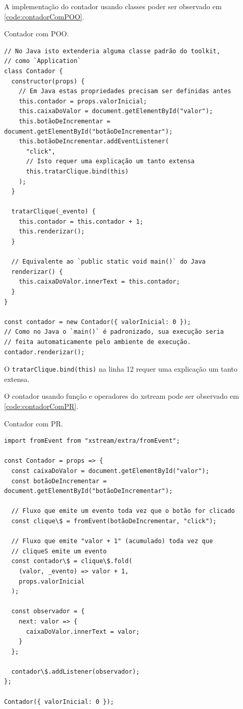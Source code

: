 A implementação do contador usando classes poder ser observado em
\ref{code:contadorComPOO}.

\begin{listing}[htbp]
\caption{\label{code:contadorComPOO}Contador com POO.}
\begin{verbatim}
// No Java isto extenderia alguma classe padrão do toolkit,
// como `Application`
class Contador {
  constructor(props) {
    // Em Java estas propriedades precisam ser definidas antes
    this.contador = props.valorInicial;
    this.caixaDoValor = document.getElementById("valor");
    this.botãoDeIncrementar = document.getElementById("botãoDeIncrementar");
    this.botãoDeIncrementar.addEventListener(
      "click",
      // Isto requer uma explicação um tanto extensa
      this.tratarClique.bind(this)
    );
  }

  tratarClique(_evento) {
    this.contador = this.contador + 1;
    this.renderizar();
  }

  // Equivalente ao `public static void main()` do Java
  renderizar() {
    this.caixaDoValor.innerText = this.contador;
  }
}

const contador = new Contador({ valorInicial: 0 });
// Como no Java o `main()` é padronizado, sua execução seria
// feita automaticamente pelo ambiente de execução.
contador.renderizar();
\end{verbatim}
\end{listing}

O \texttt{tratarClique.bind(this)} na linha 12 requer uma explicação um tanto
extensa.

O contador usando função e operadores do xstream pode ser observado em
\ref{code:contadorComPR}.

\begin{listing}[htbp]
\caption{\label{code:contadorComPR}Contador com PR.}
\begin{verbatim}
import fromEvent from "xstream/extra/fromEvent";

const Contador = props => {
  const caixaDoValor = document.getElementById("valor");
  const botãoDeIncrementar = document.getElementById("botãoDeIncrementar");

  // Fluxo que emite um evento toda vez que o botão for clicado
  const clique\$ = fromEvent(botãoDeIncrementar, "click");

  // Fluxo que emite "valor + 1" (acumulado) toda vez que
  // cliqueS emite um evento
  const contador\$ = clique\$.fold(
    (valor, _evento) => valor + 1,
    props.valorInicial
  );

  const observador = {
    next: valor => {
      caixaDoValor.innerText = valor;
    }
  };

  contador\$.addListener(observador);
};

Contador({ valorInicial: 0 });
\end{verbatim}
\end{listing}

